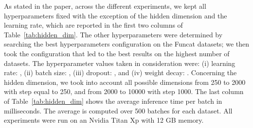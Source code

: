 \documentclass{article}
\begin{document}
As stated in the paper, across the different experiments, we kept all hyperparameters fixed with the exception of the hidden dimension and the learning rate, which are reported in the first two columns of Table~\ref{tab:hidden_dim}. The other hyperparameters were determined by searching the best hyperparameters configuration on the Funcat datasets; we then took the configuration that led to the best results on the highest number of datasets. The hyperparameter values taken in consideration were: 
(i) learning rate: , (ii) batch size: , (iii) dropout: , and (iv) weight decay: . Concerning the hidden dimension, we took into account all possible dimensions from 250 to 2000 with step equal to 250, and from 2000 to 10000 with step 1000. 
The last column of Table~\ref{tab:hidden_dim} shows the average inference time per batch in milliseconds. The average is computed over 500 batches for each dataset.
All experiments were run on an Nvidia Titan Xp with 12 GB  memory. 
\end{document}
